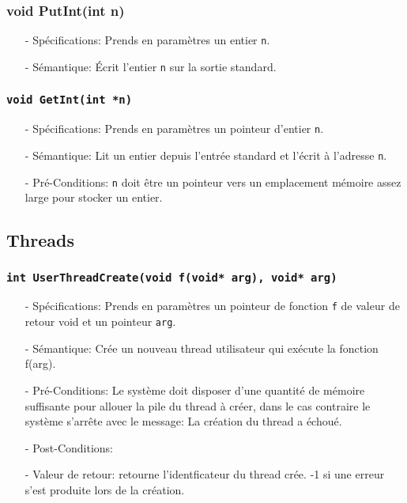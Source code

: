 \documentclass[11pt]{article}
\begin{document}
\subsubsection{void PutInt(int n)}
\begin{itemize}
\item[-] Spécifications: Prends en paramètres un entier \texttt{n}.
\item[-] Sémantique: Écrit l'entier \texttt{n} sur la sortie standard.
\end{itemize}

\subsubsection{\texttt{void GetInt(int *n)}}
\begin{itemize}
\item[-] Spécifications: Prends en paramètres un pointeur d'entier \texttt{n}.
\item[-] Sémantique: Lit un entier depuis l'entrée standard et l'écrit à l'adresse \texttt{n}.
\item[-] Pré-Conditions:
  \texttt{n} doit être un pointeur vers un emplacement mémoire assez large pour stocker un entier.
\end{itemize}





\subsection{Threads}

\subsubsection{\texttt{int UserThreadCreate(void f(void* arg), void* arg)}}
\begin{itemize}
\item[-] Spécifications: Prends en paramètres un pointeur de fonction \texttt{f} de valeur de retour
  void et un pointeur \texttt{arg}.
\item[-] Sémantique: Crée un nouveau thread utilisateur qui exécute la fonction f(arg).
\item[-] Pré-Conditions: Le système doit disposer d'une quantité de mémoire suffisante pour allouer la
  pile du thread à créer, dans le cas contraire le système s'arrête avec le message:
  La création du thread a échoué.
\item[-] Post-Conditions: 
\item[-] Valeur de retour: retourne l'identficateur du thread crée. -1 si une erreur s'est produite lors de
  la création.
\end{itemize}
\end{document}
